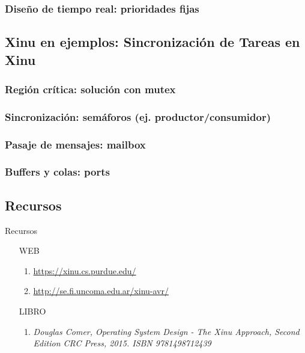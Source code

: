 \documentclass[8pt,aspectratio=169,compress]{beamer}
\begin{document}
\subsubsection{Diseño de tiempo real: prioridades fijas}
\subsection{Xinu en ejemplos: Sincronización de Tareas en Xinu}
\subsubsection{Región crítica: solución con mutex}
\subsubsection{Sincronización: semáforos (ej. productor/consumidor)}
\subsubsection{Pasaje de mensajes: mailbox}
\subsubsection{Buffers y colas: ports}























\subsection{Recursos}




\begin{frame}{Recursos}

\begin{itemize}

\item [WEB]
\begin{enumerate}
\item \textcolor{blue}{\footnotesize \url{https://xinu.cs.purdue.edu/}}
\item \textcolor{blue}{\footnotesize \url{http://se.fi.uncoma.edu.ar/xinu-avr/}}
\end{enumerate}

\item [LIBRO]

\begin{enumerate}
\item \textit{Douglas Comer, Operating System Design - The Xinu Approach, Second Edition CRC Press, 2015. ISBN 9781498712439}
\end{enumerate}

\end{itemize}



\end{frame}
\end{document}
